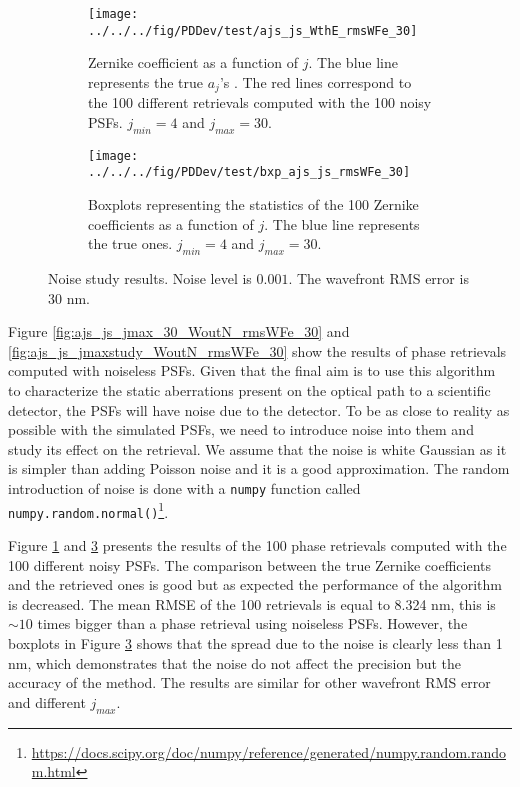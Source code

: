 \begin{figure}
\centering
    \begin{subfigure}{0.45\textwidth}
        \texttt{[image: ../../../fig/PDDev/test/ajs\_js\_WthE\_rmsWFe\_30]}
        \caption{Zernike coefficient as a function of $j$.  The blue line represents the true $a_j$'s . The red lines correspond to the 100 different retrievals computed with the 100 noisy PSFs. $j_{min}=4$ and $j_{max}=30$.}
        \label{subfig:ajs_js_WthE_rmsWFe_30}
    \end{subfigure}
    \quad
    \begin{subfigure}{0.45\textwidth}
        \texttt{[image: ../../../fig/PDDev/test/bxp\_ajs\_js\_rmsWFe\_30]}
        \caption{Boxplots representing the statistics of the 100 Zernike coefficients as a function of $j$. The blue line represents the true ones. $j_{min}=4$ and $j_{max}=30$.}
        \label{subfig:bxp_ajs_js_rmsWFe_30}
    \end{subfigure}
    \decoRule
    \caption{Noise study results. Noise level is $0.001$. The wavefront RMS error is 30 nm.}
\end{figure}

Figure \ref{fig:ajs_js_jmax_30_WoutN_rmsWFe_30} and \ref{fig:ajs_js_jmaxstudy_WoutN_rmsWFe_30} show the results of phase retrievals computed with noiseless PSFs. Given that the final aim is to use this algorithm to characterize the static aberrations present on the optical path to a scientific detector, the PSFs will have noise due to the detector. To be as close to reality as possible with the simulated PSFs, we need to introduce noise into them and study its effect on the retrieval. We assume that the noise is white Gaussian as it is simpler than adding Poisson noise and it is a good approximation. The random introduction of noise is done with a \verb!numpy! function called \verb!numpy.random.normal()!\footnote{\url{https://docs.scipy.org/doc/numpy/reference/generated/numpy.random.random.html}}.

Figure \ref{subfig:ajs_js_WthE_rmsWFe_30} and \ref{subfig:bxp_ajs_js_rmsWFe_30} presents the results of the 100 phase retrievals computed with the 100 different noisy PSFs. The comparison between the true Zernike coefficients and the retrieved ones is good but as expected the performance of the algorithm is decreased. The mean RMSE of the 100 retrievals is equal to 8.324 nm, this is $\sim10$ times bigger than a phase retrieval using noiseless PSFs. However, the boxplots in Figure \ref{subfig:bxp_ajs_js_rmsWFe_30} shows that the spread due to the noise is clearly less than 1 nm, which demonstrates that the noise do not affect the precision but the accuracy of the method. The results are similar for other wavefront RMS error and different $j_{max}$.

